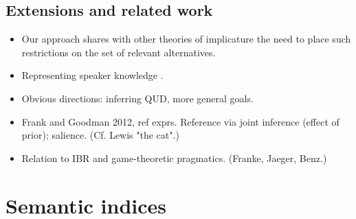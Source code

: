 \documentclass[pdfextras]{handbook}
\begin{document}



\subsection{Extensions and related work}


\begin{itemize}
\item Our approach shares with other theories of implicature the need to place such restrictions on the set of relevant alternatives.
\item Representing speaker knowledge \cite{Goodman2013}.
\item Obvious directions: inferring QUD, more general goals.
\item Frank and Goodman 2012, ref exprs. Reference via joint inference (effect of prior); salience. (Cf. Lewis "the cat".)
\item Relation to IBR and game-theoretic pragmatics. (Franke, Jaeger, Benz.)
\end{itemize}





\section{Semantic indices}
\label{indices}
\end{document}
